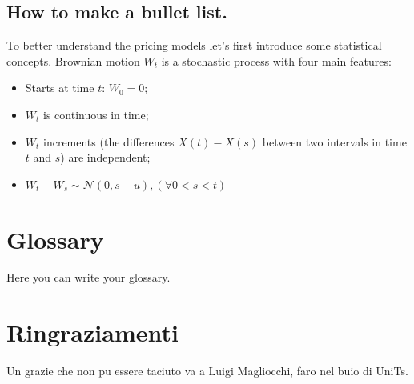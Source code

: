 \documentclass{article}
\begin{document}
\section{How to make a bullet list.}
To better understand the pricing models let's first introduce some statistical concepts. Brownian motion $W_t$ is a stochastic process with four main features: 
\begin{itemize}
    \item Starts at time $t$: $W_0 = 0$;
    \item $W_t$ is continuous in time;
    \item $W_t$ increments (the differences $X(t)-X(s)$ between two intervals in time $t$ and $s$) are independent;
    \item $W_t - W_s \sim \mathcal{N}(0, s-u), (\forall 0 < s < t) $
\end{itemize}




\chapter{Glossary}
Here you can write your glossary.


\chapter{Ringraziamenti}

Un grazie che non pu  essere taciuto va a Luigi Magliocchi, faro nel buio di UniTs.
\end{document}
